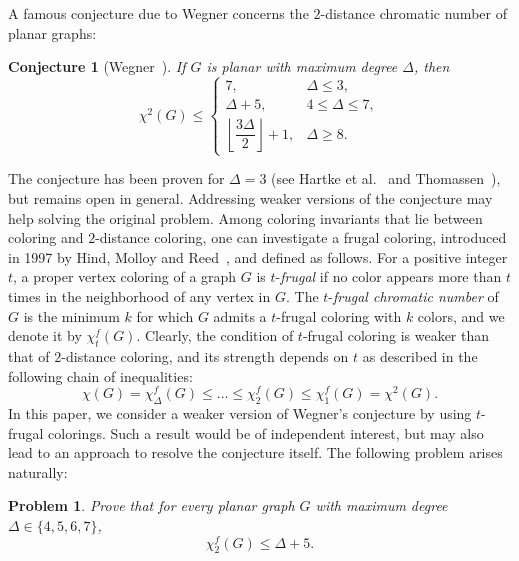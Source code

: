 \documentclass[10pt,a4paper]{article}
\newcommand{\fd}{\chi_{2}^{f}}
\newtheorem{problem}[theorem]{Problem}
\newtheorem{conjecture}[theorem]{Conjecture}
\begin{document}
A famous conjecture due to Wegner \cite{wegner} concerns the $2$-distance chromatic number of planar graphs:

\begin{conjecture}[Wegner~\cite{wegner}]
If $G$ is planar with maximum degree $\Delta$, then
\[
\chi^2(G) \leq 
\begin{cases}
7, & \Delta \leq 3, \\
\Delta + 5, & 4 \leq \Delta \leq 7, \\
\left\lfloor \dfrac{3\Delta}{2} \right\rfloor + 1, & \Delta \geq 8.
\end{cases}
\]
\label{conj:W}
\end{conjecture}

The conjecture has been proven for $\Delta=3$ (see Hartke et al.~\cite{HJT} and Thomassen~\cite{th-2018}), but remains open in general. 
Addressing weaker versions of the conjecture may help solving the original problem. %
Among coloring invariants that lie between coloring and $2$-distance coloring, one can investigate a frugal coloring, introduced in 1997 by Hind, Molloy and Reed~\cite{HMR}, and defined as follows. 
For a positive integer $t$, a proper vertex coloring of a graph $G$ is $t$-\textit{frugal} if no color appears more than $t$ times in the neighborhood of any vertex in $G$. The $t$-\textit{frugal chromatic number} of $G$ is the minimum $k$ for which $G$ admits a $t$-frugal coloring with $k$ colors, and we denote it by $\chi_t^f(G)$. Clearly, the condition of $t$-frugal coloring is weaker than that of $2$-distance coloring, and its strength depends on $t$ as described in the following chain of inequalities:
$$\chi(G)=\chi_{\Delta}^{f}(G)\leq \ldots\leq \chi_{2}^{f}(G)\leq \chi_{1}^{f}(G)=\chi^2(G).$$
In this paper, we consider a weaker version of Wegner's conjecture by using $t$-frugal colorings. Such a result would be of independent interest, but may also lead to an approach to resolve the conjecture itself.  The following problem arises naturally:

\begin{problem}
\label{p:limited1}
Prove that for every planar graph $G$ with maximum degree $\Delta\in \{4,5,6,7\}$, $$\fd(G)\le \Delta+5. $$ 
\end{problem}
\end{document}
